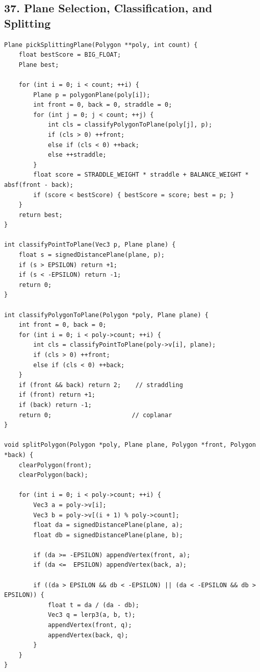 \documentclass[10pt,letterpaper]{article}
\begin{document}
\subsection*{37. Plane Selection, Classification, and Splitting}

\begin{verbatim}
Plane pickSplittingPlane(Polygon **poly, int count) {
    float bestScore = BIG_FLOAT;
    Plane best;

    for (int i = 0; i < count; ++i) {
        Plane p = polygonPlane(poly[i]);
        int front = 0, back = 0, straddle = 0;
        for (int j = 0; j < count; ++j) {
            int cls = classifyPolygonToPlane(poly[j], p);
            if (cls > 0) ++front;
            else if (cls < 0) ++back;
            else ++straddle;
        }
        float score = STRADDLE_WEIGHT * straddle + BALANCE_WEIGHT * absf(front - back);
        if (score < bestScore) { bestScore = score; best = p; }
    }
    return best;
}

int classifyPointToPlane(Vec3 p, Plane plane) {
    float s = signedDistancePlane(plane, p);
    if (s > EPSILON) return +1;
    if (s < -EPSILON) return -1;
    return 0;
}

int classifyPolygonToPlane(Polygon *poly, Plane plane) {
    int front = 0, back = 0;
    for (int i = 0; i < poly->count; ++i) {
        int cls = classifyPointToPlane(poly->v[i], plane);
        if (cls > 0) ++front;
        else if (cls < 0) ++back;
    }
    if (front && back) return 2;    // straddling
    if (front) return +1;
    if (back) return -1;
    return 0;                      // coplanar
}

void splitPolygon(Polygon *poly, Plane plane, Polygon *front, Polygon *back) {
    clearPolygon(front);
    clearPolygon(back);

    for (int i = 0; i < poly->count; ++i) {
        Vec3 a = poly->v[i];
        Vec3 b = poly->v[(i + 1) % poly->count];
        float da = signedDistancePlane(plane, a);
        float db = signedDistancePlane(plane, b);

        if (da >= -EPSILON) appendVertex(front, a);
        if (da <=  EPSILON) appendVertex(back, a);

        if ((da > EPSILON && db < -EPSILON) || (da < -EPSILON && db > EPSILON)) {
            float t = da / (da - db);
            Vec3 q = lerp3(a, b, t);
            appendVertex(front, q);
            appendVertex(back, q);
        }
    }
}
\end{verbatim}
\end{document}
